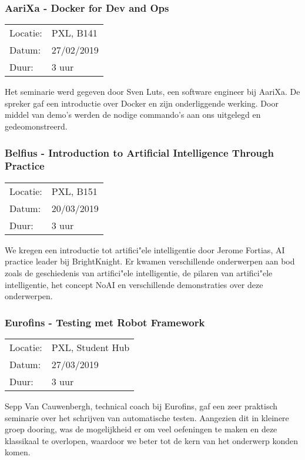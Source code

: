 \subsubsection{AariXa - Docker for Dev and Ops}

\begin{tabular}{l l}
  Locatie: & PXL, B141\\
  Datum: & 27/02/2019\\
  Duur: & 3 uur
\end{tabular}

Het seminarie werd gegeven door Sven Luts, een software engineer bij AariXa. De spreker gaf een introductie over Docker en zijn onderliggende werking. Door middel van demo's werden de nodige commando's aan ons uitgelegd en gedeomonstreerd.

\subsubsection{Belfius - Introduction to Artificial Intelligence Through Practice}

\begin{tabular}{l l}
  Locatie: & PXL, B151\\
  Datum: & 20/03/2019\\
  Duur: & 3 uur
\end{tabular}

We kregen een introductie tot artifici"ele intelligentie door Jerome Fortias, AI practice leader bij BrightKnight. Er kwamen verschillende onderwerpen aan bod zoals de geschiedenis van artifici"ele intelligentie, de pilaren van artifici"ele intelligentie, het concept NoAI en verschillende demonstraties over deze onderwerpen.

\subsubsection{Eurofins - Testing met Robot Framework}

\begin{tabular}{l l}
  Locatie: & PXL, Student Hub\\
  Datum: & 27/03/2019\\
  Duur: & 3 uur
\end{tabular}

Sepp Van Cauwenbergh, technical coach bij Eurofins, gaf een zeer praktisch seminarie over het schrijven van automatische testen. Aangezien dit in kleinere groep dooring, was de mogelijkheid er om veel oefeningen te maken en deze klassikaal te overlopen, waardoor we beter tot de kern van het onderwerp konden komen.


